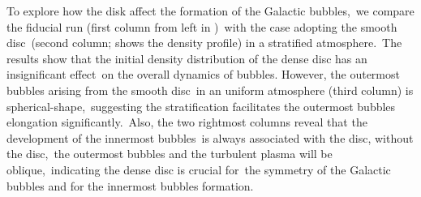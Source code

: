 \documentclass[twocolumn]{aastex631}
\begin{document}
 To explore how the disk affect the formation of the Galactic bubbles,\
 we compare the fiducial run (first column from left in )\
 with the case adopting the smooth disc\
 (second column;  shows the density profile) in a stratified atmosphere.\
 The results show that the initial density distribution of the dense disc has an insignificant effect\
 on the overall dynamics of bubbles. However, the outermost bubbles arising from the smooth disc\
 in an uniform atmosphere (third column) is spherical-shape,\
 suggesting the stratification facilitates the outermost bubbles elongation significantly.\
 Also, the two rightmost columns reveal that the development of the innermost bubbles\
 is always associated with the disc, without the disc,\
 the outermost bubbles and the turbulent plasma will be oblique,\
 indicating the dense disc is crucial for\
 the symmetry of the Galactic bubbles and for the innermost bubbles formation.



\end{document}
